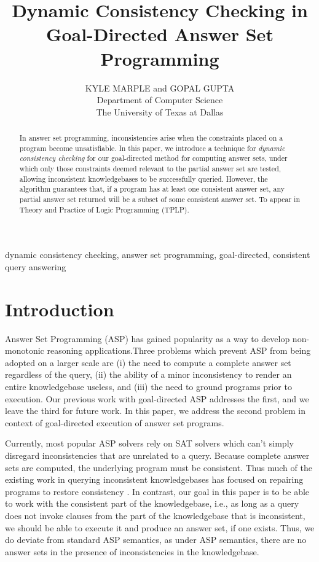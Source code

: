 \documentclass{new_tlp}
\title[Dynamic Consistency Checking]
	{Dynamic Consistency Checking in Goal-Directed Answer Set Programming}
\author[K. Marple and G. Gupta]
	{KYLE MARPLE and GOPAL GUPTA\\
	Department of Computer Science\\
	The University of Texas at Dallas}
\begin{document}
\maketitle

\begin{abstract}
In answer set programming, inconsistencies arise when the constraints placed on 
a program become unsatisfiable. In this paper, we introduce a technique for 
\textit{dynamic consistency checking} for our goal-directed method for computing
answer sets, under which only those constraints deemed relevant to the partial
answer set are tested, allowing inconsistent knowledgebases to be successfully
queried. However, the algorithm guarantees that, if a program has at least one
consistent answer set, any partial answer set returned will be a subset of some
consistent answer set. To appear in Theory and Practice of Logic Programming
(TPLP).
\end{abstract}

\begin{keywords}
dynamic consistency checking, answer set programming, goal-directed,
consistent query answering
\end{keywords}

\section{Introduction}

Answer Set Programming (ASP) \cite{asp} has gained popularity as a way to 
develop non-monotonic reasoning applications.Three problems which prevent ASP 
from being adopted on a larger scale are (i) the need to compute a complete 
answer set regardless of the query, (ii) the ability of a minor inconsistency 
to render an entire knowledgebase useless, and (iii) the need to ground 
programs prior to execution. Our previous work with goal-directed ASP addresses
the first\cite{goalasp}, and we leave the third for future work. In this paper,
we address the second problem in context of goal-directed execution of answer
set programs. 

Currently, most popular ASP solvers rely on SAT solvers \cite{cmodels,clasp} 
which can't simply disregard inconsistencies that are unrelated to a query.
Because complete answer sets are computed, the underlying program must be
consistent. Thus much of the existing work in querying inconsistent 
knowledgebases has focused on repairing programs to restore consistency
\cite{arenas2003}. In contrast, our goal in this paper is to be able to work
with the consistent part of the knowledgebase, i.e., as long as a query does
not invoke clauses from the part of the knowledgebase that is inconsistent, we
should be able to execute it and produce an answer set, if one exists. Thus, we
do deviate from standard ASP semantics, as under ASP semantics, there are no
answer sets in the presence of inconsistencies in the knowledgebase.
\end{document}
